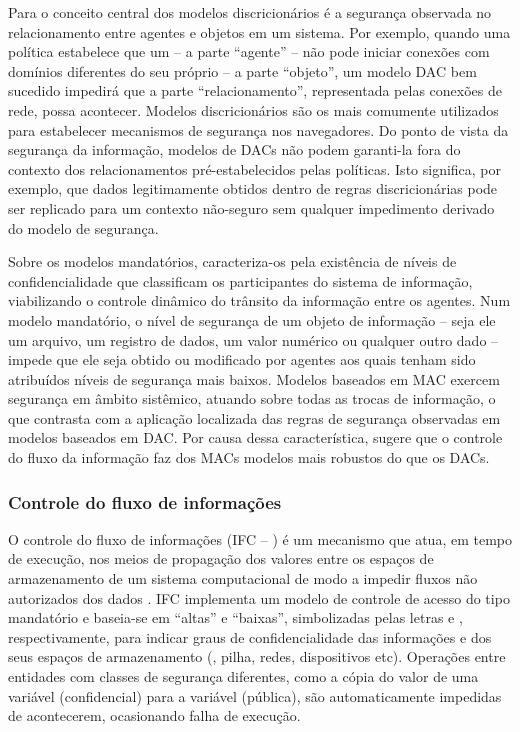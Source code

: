 Para \citeauthor{Foster1998} o conceito central dos modelos discricionários é a segurança observada no relacionamento entre agentes e objetos em um sistema. Por exemplo, quando uma política estabelece que um {\script} -- a parte ``agente'' -- não pode iniciar conexões com domínios diferentes do seu próprio -- a parte ``objeto'', um modelo DAC bem sucedido impedirá que a parte ``relacionamento'', representada pelas conexões de rede, possa acontecer. Modelos discricionários são os mais comumente utilizados para estabelecer mecanismos de segurança nos navegadores. Do ponto de vista da segurança da informação, modelos de DACs não podem garanti-la  fora do contexto dos relacionamentos pré-estabelecidos pelas políticas. Isto significa, por exemplo, que dados legitimamente obtidos dentro de regras discricionárias pode ser replicado para um contexto não-seguro sem qualquer impedimento derivado do modelo de segurança.

Sobre os modelos mandatórios, \citeauthor{Foster1998} caracteriza-os pela existência de níveis de confidencialidade que classificam os participantes do sistema de informação, viabilizando o controle dinâmico do trânsito da informação entre os agentes. Num modelo mandatório, o nível de segurança de um objeto de informação -- seja ele um arquivo, um registro de dados, um valor numérico ou qualquer outro dado -- impede que ele seja obtido ou modificado por agentes aos quais tenham sido atribuídos níveis de segurança mais baixos. Modelos baseados em MAC exercem segurança em âmbito sistêmico, atuando sobre todas as trocas de informação, o que contrasta com a aplicação localizada das regras de segurança observadas em modelos baseados em DAC. Por causa dessa característica, \citeauthor{Foster1998} sugere que o controle do fluxo da informação faz dos MACs modelos mais robustos do que os DACs.

\subsubsection{Controle do fluxo de informações}
O controle do fluxo de informações (IFC -- ) é um mecanismo que atua, em tempo de execução, nos meios de propagação dos valores entre os espaços de armazenamento de um sistema computacional de modo a impedir fluxos não autorizados dos dados \cite{Denning1976}. IFC implementa um modelo de controle de acesso do tipo mandatório e baseia-se em  ``altas'' e ``baixas'', simbolizadas pelas letras  e , respectivamente, para indicar graus de confidencialidade das informações e dos seus espaços de armazenamento (, pilha, redes, dispositivos etc). Operações entre entidades com classes de segurança diferentes, como a cópia do valor de uma variável  (confidencial) para a variável  (pública), são automaticamente impedidas de acontecerem, ocasionando falha de execução.

